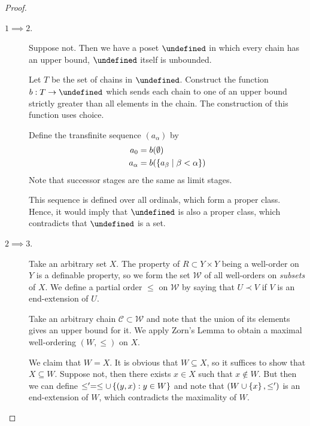 \documentclass[11pt]{article}
\let\P\undefined
\begin{document}
\begin{proof}
    \begin{description}
        \item[$1 \implies 2$.]
            Suppose not. Then we have a poset $\P$ in which every chain has an
            upper bound, $\P$ itself is unbounded.

            Let $T$ be the set of chains in $\P$.
            Construct the function $b : T \to \P$ which sends each chain to one
            of an upper bound strictly greater than all elements in the chain.
            The construction of this function uses choice.

            Define the transfinite sequence $(a_\alpha)$ by
            \begin{align*}
                a_0 &= b(\emptyset) \\
                a_\alpha &= b(\left\{a_\beta \;\vert\; \beta < \alpha\right\})
            \end{align*}
            Note that successor stages are the same as limit stages.

            This sequence is defined over all ordinals, which form a proper
            class. Hence, it would imply that $\P$ is also a proper class,
            which contradicts that $\P$ is a set.

        \item[$2 \implies 3$.]
            Take an arbitrary set $X$.
            The property of $R \subset Y \times Y$ being a well-order on $Y$ is
            a definable property, so we form the set $\mathcal{W}$ of all
            well-orders on \emph{subsets} of $X$.
            We define a partial order $\leq$ on $\mathcal{W}$ by saying that
            $U \prec V$ if $V$ is an end-extension of $U$.

            Take an arbitrary chain $\mathcal{C} \subset \mathcal{W}$ and note
            that the union of its elements gives an upper bound for it. We
            apply Zorn's Lemma to obtain a maximal well-ordering $(W, \leq)$ on
            $X$.

            We claim that $W = X$.
            It is obvious that $W \subseteq X$,
            so it suffices to show that $X \subseteq W$.
            Suppose not, then there exists $x \in X$ such that $x \notin W$.
            But then we can define
            $\leq^\prime = \leq \cup \left\{(y, x) : y \in W\right\}$
            and note that $(W \cup \left\{x\right\}, \leq^\prime)$ is an
            end-extension of $W$, which contradicts the maximality of $W$.


\end{description}
\end{proof}
\end{document}
